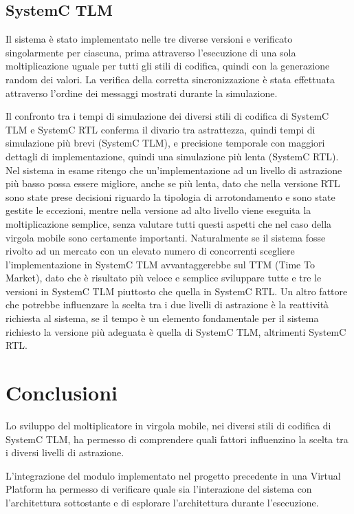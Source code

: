 \documentclass[]{IEEEtran}
\begin{document}
	\subsection{SystemC TLM}
	Il sistema \`e stato implementato nelle tre diverse versioni e verificato singolarmente per ciascuna, prima attraverso l'esecuzione di una sola moltiplicazione uguale per tutti gli stili di codifica, quindi con la generazione random dei valori. La verifica della corretta sincronizzazione \`e stata effettuata attraverso l'ordine dei messaggi mostrati durante la simulazione. 

	Il confronto tra i tempi di simulazione dei diversi stili di codifica di SystemC TLM e SystemC RTL conferma il divario tra astrattezza, quindi tempi di simulazione pi\`u brevi (SystemC TLM), e precisione temporale con maggiori dettagli di implementazione, quindi una simulazione pi\`u lenta (SystemC RTL). Nel sistema in esame ritengo che un'implementazione ad un livello di astrazione pi\`u basso possa essere migliore, anche se pi\`u lenta, dato che nella versione RTL sono state prese decisioni riguardo la tipologia di arrotondamento e sono state gestite le eccezioni, mentre nella versione ad alto livello viene eseguita la moltiplicazione semplice, senza valutare tutti questi aspetti che nel caso della virgola mobile sono certamente importanti. Naturalmente se il sistema fosse rivolto ad un mercato con un elevato numero di concorrenti scegliere l'implementazione in SystemC TLM avvantaggerebbe sul TTM (Time To Market), dato che \`e risultato pi\`u veloce e semplice sviluppare tutte e tre le versioni in SystemC TLM piuttosto che quella in SystemC RTL. Un altro fattore che potrebbe influenzare la scelta tra i due livelli di astrazione \`e la reattivit\`a richiesta al sistema, se il tempo \`e un elemento fondamentale per il sistema richiesto la versione pi\`u adeguata \`e quella di SystemC TLM, altrimenti SystemC RTL. 
	
	\section{Conclusioni}
	Lo sviluppo del moltiplicatore in virgola mobile, nei diversi stili di codifica di SystemC TLM, ha permesso di comprendere quali fattori influenzino la scelta tra i diversi livelli di astrazione. 
	
	L'integrazione del modulo implementato nel progetto precedente in una Virtual Platform ha permesso di verificare quale sia l'interazione del sistema con l'architettura sottostante e di esplorare l'architettura durante l'esecuzione.
	
\end{document}
